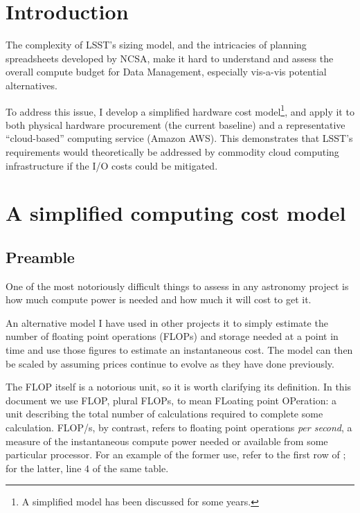\section{Introduction} \label{sect:intro}

The complexity of LSST's sizing model, and the intricacies of planning spreadsheets developed by NCSA, make it hard to understand and assess the overall compute budget for Data Management, especially vis-a-vis potential alternatives.

To address this issue, I develop a simplified hardware cost model\footnote{A simplified model has been discussed for some years.}, and apply it to both physical hardware procurement (the current baseline) and a representative “cloud-based” computing service (Amazon AWS).
This demonstrates that LSST's requirements would theoretically be addressed by commodity cloud computing
infrastructure if the I/O costs could be mitigated.


\section{A simplified computing cost model}
\label{sect:model}

\subsection{Preamble}

One of the most notoriously difficult things to assess in any astronomy project is how much compute power is needed and how much it will cost to get it.

An alternative model I have used in other  projects it to simply estimate the number of floating point operations (FLOPs) and storage needed at a point in time and use those figures to estimate an instantaneous cost. The model can then be scaled by assuming prices continue to evolve as they have done previously.

The FLOP itself is a notorious unit, so it is worth clarifying its definition. In this document we use FLOP, plural FLOPs, to mean FLoating point OPeration: a unit describing the total number of calculations required to complete some calculation.
FLOP/s, by contrast, refers to floating point operations \emph{per second}, a measure of the instantaneous compute power needed or available from some particular processor.
For an example of the former use, refer to the first row of ; for the latter, line 4 of the same table.

